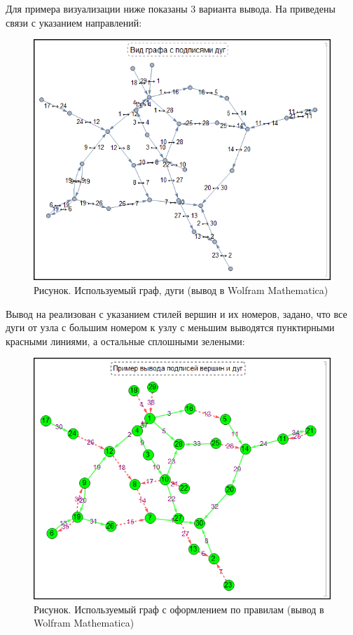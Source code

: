 Для примера визуализации ниже показаны 3 варианта вывода. На \textit{} приведены связи с указанием направлений:
\begin{figure}[H]
	\centering
	\includegraphics[scale=0.68]{images/part7/chapter_integration/integr_alg32.png}
	\caption{Рисунок. Используемый граф, дуги (вывод в Wolfram Mathematica)}
	\label{fig:integr_alg32}
\end{figure}

Вывод на \textit{} реализован с указанием стилей вершин и их номеров, задано, что все дуги от узла с большим номером к узлу с меньшим выводятся пунктирными красными линиями, а остальные сплошными зелеными:

\begin{figure}[H]
	\centering
	\includegraphics[scale=0.88]{images/part7/chapter_integration/integr_alg33.png}
	\caption{Рисунок. Используемый граф с оформлением по правилам (вывод в Wolfram Mathematica)}
	\label{fig:integr_alg33}
\end{figure}

